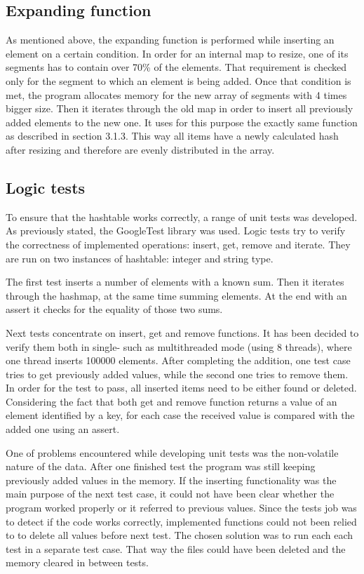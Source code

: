 \subsection{Expanding function}
    As mentioned above, the expanding function is performed while inserting an element on a certain condition. In order for an internal map to resize, one of its segments has to contain over 70\% of the elements. That requirement is checked only for the segment to which an element is being added. Once that condition is met, the program allocates memory for the new array of segments with 4 times bigger size. Then it iterates through the old map in order to insert all previously added elements to the new one. It uses for this purpose the exactly same function as described in section 3.1.3. This way all items have a newly calculated hash after resizing and therefore are evenly distributed in the array.

\subsection{Logic tests}
    To ensure that the hashtable works correctly, a range of unit tests was developed. As previously stated, the GoogleTest library was used. Logic tests try to verify the correctness of implemented operations: insert, get, remove and iterate. They are run on two instances of hashtable: integer and string type. 
    
    The first test inserts a number of elements with a known sum. Then it iterates through the hashmap, at the same time summing elements. At the end with an assert it checks for the equality of those two sums. 
    
    Next tests concentrate on insert, get and remove functions. It has been decided to verify them both in single- such as multithreaded mode (using 8 threads), where one thread inserts 100000 elements. After completing the addition, one test case tries to get previously added values, while the second one tries to remove them. In order for the test to pass, all inserted items need to be either found or deleted. Considering the fact that both get and remove function returns a value of an element identified by a key, for each case the received value is compared with the added one using an assert.
    
    One of problems encountered while developing unit tests was the non-volatile nature of the data. After one finished test the program was still keeping previously added values in the memory. If the inserting functionality was the main purpose of the next test case, it could not have been clear whether the program worked properly or it referred to previous values. Since the tests job was to detect if the code works correctly, implemented functions could not been relied to to delete all values before next test. The chosen solution was to run each each test in a separate test case. That way the files could have been deleted and the memory cleared in between tests.
    
